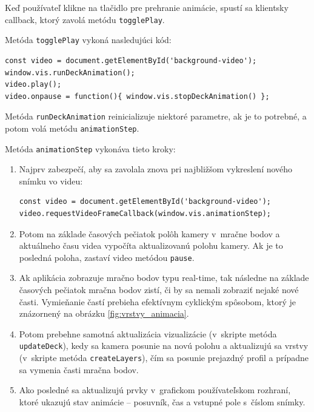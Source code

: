 Keď používateľ klikne na tlačidlo pre prehranie animácie, spustí sa klientsky callback, ktorý zavolá metódu \texttt{togglePlay}.

Metóda \texttt{togglePlay} vykoná nasledujúci kód:

\begin{lstlisting}
const video = document.getElementById('background-video');
window.vis.runDeckAnimation();
video.play();
video.onpause = function(){ window.vis.stopDeckAnimation() };
\end{lstlisting}

Metóda \texttt{runDeckAnimation} reinicializuje niektoré parametre, ak je to potrebné, a potom volá metódu \texttt{animationStep}.

Metóda \texttt{animationStep} vykonáva tieto kroky:

\begin{enumerate}
    \item Najprv zabezpečí, aby sa zavolala znova pri najbližšom vykreslení nového snímku vo videu:
    \begin{lstlisting}
const video = document.getElementById('background-video');
video.requestVideoFrameCallback(window.vis.animationStep);
    \end{lstlisting}

    \item Potom na základe časových pečiatok polôh kamery v~mračne bodov a aktuálneho času videa vypočíta aktualizovanú polohu kamery. Ak je to posledná poloha, zastaví video metódou \texttt{pause}.

    \item Ak aplikácia zobrazuje mračno bodov typu real-time, tak následne na základe časových pečiatok mračna bodov zistí, či by sa nemali zobraziť nejaké nové časti. Vymieňanie častí prebieha efektívnym cyklickým spôsobom, ktorý je znázornený na obrázku \ref{fig:vrstvy_animacia}.

    \item Potom prebehne samotná aktualizácia vizualizácie (v~skripte metóda \texttt{updateDeck}), kedy sa kamera posunie na novú polohu a aktualizujú sa vrstvy (v~skripte metóda \texttt{createLayers}), čím sa posunie prejazdný profil a prípadne sa vymenia časti mračna bodov.

    \item Ako posledné sa aktualizujú prvky v~grafickom používateľskom rozhraní, ktoré ukazujú stav animácie -- posuvník, čas a vstupné pole s~číslom snímky.
\end{enumerate}


